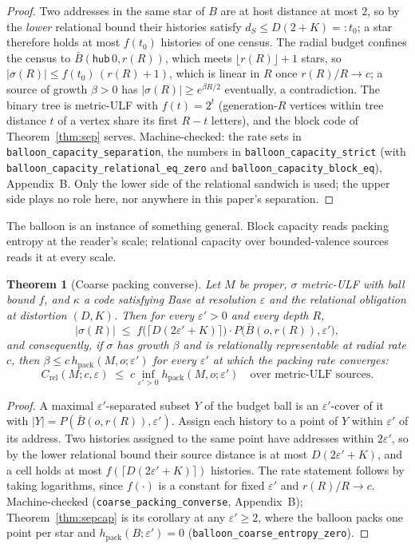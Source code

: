 \documentclass[11pt,reqno]{amsart}
\theoremstyle{plain}
\newtheorem{theorem}{Theorem}[section]
\theoremstyle{definition}
\newcommand{\hpack}{h_{\mathrm{pack}}}
\newcommand{\Crel}{C_{\mathrm{rel}}}
\newcommand{\eps}{\varepsilon}
\begin{document}
\begin{proof}
Two addresses in the same star of $B$ are at host distance at most $2$, so by the \emph{lower} relational bound their histories satisfy $d_S\le D(2+K)=:t_0$; a star therefore holds at most $f(t_0)$ histories of one census. The radial budget confines the census to $\bar B(\mathsf{hub}\,0,r(R))$, which meets $\lfloor r(R)\rfloor+1$ stars, so $|\sigma(R)|\le f(t_0)\,(r(R)+1)$, which is linear in $R$ once $r(R)/R\to c$; a source of growth $\beta>0$ has $|\sigma(R)|\ge e^{\beta R/2}$ eventually, a contradiction. The binary tree is metric-ULF with $f(t)=2^t$ (generation-$R$ vertices within tree distance $t$ of a vertex share its first $R-t$ letters), and the block code of Theorem~\ref{thm:sep} serves. Machine-checked: the rate sets in \texttt{balloon\_capacity\_separation}, the numbers in \texttt{balloon\_capacity\_strict} (with \texttt{balloon\_capacity\_relational\_eq\_zero} and \texttt{balloon\_capacity\_block\_eq}), Appendix~B. Only the lower side of the relational sandwich is used; the upper side plays no role here, nor anywhere in this paper's separation.
\end{proof}

The balloon is an instance of something general. Block capacity reads packing entropy at the reader's scale; relational capacity over bounded-valence sources reads it at every scale.

\begin{theorem}[Coarse packing converse]\label{thm:coarse}
Let $M$ be proper, $\sigma$ metric-ULF with ball bound $f$, and $\kappa$ a code satisfying Base at resolution $\eps$ and the relational obligation at distortion $(D,K)$. Then for every $\eps'>0$ and every depth $R$,
\[
|\sigma(R)|\;\le\;f\bigl(\lceil D(2\eps'+K)\rceil\bigr)\cdot P\bigl(\bar B(o,r(R)),\eps'\bigr),
\]
and consequently, if $\sigma$ has growth $\beta$ and is relationally representable at radial rate $c$, then $\beta\le c\,\hpack(M,o;\eps')$ for every $\eps'$ at which the packing rate converges:
\[
\Crel(M;c,\eps)\;\le\;c\inf_{\eps'>0}\hpack(M,o;\eps')\quad\text{over metric-ULF sources.}
\]
\end{theorem}

\begin{proof}
A maximal $\eps'$-separated subset $Y$ of the budget ball is an $\eps'$-cover of it with $|Y|=P(\bar B(o,r(R)),\eps')$. Assign each history to a point of $Y$ within $\eps'$ of its address. Two histories assigned to the same point have addresses within $2\eps'$, so by the lower relational bound their source distance is at most $D(2\eps'+K)$, and a cell holds at most $f(\lceil D(2\eps'+K)\rceil)$ histories. The rate statement follows by taking logarithms, since $f(\cdot)$ is a constant for fixed $\eps'$ and $r(R)/R\to c$. Machine-checked (\texttt{coarse\_packing\_converse}, Appendix~B); Theorem~\ref{thm:sepcap} is its corollary at any $\eps'\ge2$, where the balloon packs one point per star and $\hpack(B;\eps')=0$ (\texttt{balloon\_coarse\_entropy\_zero}).
\end{proof}
\end{document}
